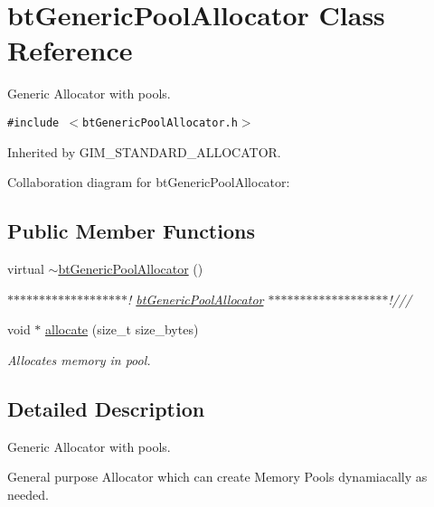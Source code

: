\hypertarget{classbt_generic_pool_allocator}{
\section{btGenericPoolAllocator Class Reference}
\label{classbt_generic_pool_allocator}
}
Generic Allocator with pools.  


{\tt \#include $<$btGenericPoolAllocator.h$>$}

Inherited by GIM\_\-STANDARD\_\-ALLOCATOR.

Collaboration diagram for btGenericPoolAllocator:\subsection*{Public Member Functions}
\begin{CompactItemize}
\item 
\hypertarget{classbt_generic_pool_allocator_3d92133ad713c674e5102bfd2ca2d66a}{
virtual \hyperlink{classbt_generic_pool_allocator_3d92133ad713c674e5102bfd2ca2d66a}{$\sim$btGenericPoolAllocator} ()}
\label{classbt_generic_pool_allocator_3d92133ad713c674e5102bfd2ca2d66a}

\begin{CompactList}\small\item\em $\ast$$\ast$$\ast$$\ast$$\ast$$\ast$$\ast$$\ast$$\ast$$\ast$$\ast$$\ast$$\ast$$\ast$$\ast$$\ast$$\ast$$\ast$$\ast$! \hyperlink{classbt_generic_pool_allocator}{btGenericPoolAllocator} $\ast$$\ast$$\ast$$\ast$$\ast$$\ast$$\ast$$\ast$$\ast$$\ast$$\ast$$\ast$$\ast$$\ast$$\ast$$\ast$$\ast$$\ast$$\ast$!/// \item\end{CompactList}\item 
void $\ast$ \hyperlink{classbt_generic_pool_allocator_e07307fd61ffa9ce47b5f198b87d17e1}{allocate} (size\_\-t size\_\-bytes)
\begin{CompactList}\small\item\em Allocates memory in pool. \item\end{CompactList}\end{CompactItemize}


\subsection{Detailed Description}
Generic Allocator with pools. 

General purpose Allocator which can create Memory Pools dynamiacally as needed. 


